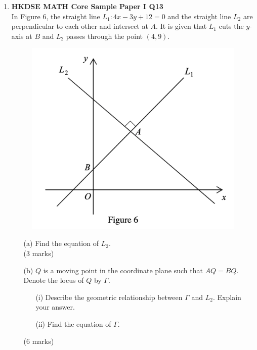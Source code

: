 \documentclass[12pt]{article}
\begin{document}
\begin{enumerate}
	\item \textbf{HKDSE MATH Core Sample Paper I Q13}\\
	In Figure 6, the straight line $L_1:4x-3y+12=0$ and the straight line $L_2$ are perpendicular to each other and intersect at $A$. It is given that $L_1$ cuts the $y$-axis at $B$ and $L_2$ passes through the point $(4,9)$.
	\begin{figure}[H]
		\centering
		\includegraphics[width = .5\linewidth]{SPFigure1.6}
	\end{figure}
	\begin{enumerate}
		\item[(a)] Find the equation of $L_2$. \\(3 marks)
		\item[(b)] $Q$ is a moving point in the coordinate plane such that $AQ = BQ$. Denote the locus of $Q$ by $\Gamma$.
		\begin{enumerate}
			\item[(i)] Describe the geometric relationship between $\Gamma$ and $L_2$. Explain your answer.
			\item[(ii)] Find the equation of $\Gamma$.
		\end{enumerate}
		(6 marks)
	\end{enumerate}


\end{enumerate}
\end{document}
